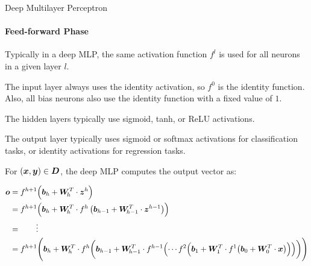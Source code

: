 %
\begin{frame}{Deep Multilayer Perceptron}
\framesubtitle{Feed-forward Phase} 
%
Typically in a deep MLP, the same activation function $f^l$ is used for
all neurons in a given layer $l$.  

	\medskip The input layer always uses the identity activation, so $f^0$ is the identity function. Also, all bias neurons also
use the identity function with a fixed value of $1$.  

\medskip

The hidden layers typically use sigmoid, tanh, or ReLU activations.  

	\medskip

	The output layer
typically uses sigmoid or softmax activations for classification tasks,
or identity activations for regression tasks. 


%
For %
$({\boldsymbol x}, {\boldsymbol y}) \in {\boldsymbol D}$,
the deep MLP computes the output vector as:
\begin{small}
\begin{samepage}
\begin{align*}
    \bo & = f^{h+1}\Bigl(\bb_{h} + \bW_{\!h}^T \cdot \bz^h\Bigr)\\ 
    & = f^{h+1}\Bigl(\bb_{h} + \bW_{\!h}^T \cdot 
    f^h\lB(\bb_{h-1} + \bW_{\!h-1}^T \cdot \bz^{h-1} \rB) \Bigr)\\
    & = \qquad \vdots\\
    & = f^{h+1}\Biggl(\bb_{h} + \bW_{\!h}^T \cdot 
        f^h\biggl(\bb_{h-1} + \bW_{\!h-1}^T \cdot f^{h-1}%
            \Bigl(\cdots f^2 \Bigl(\bb_{1} +  \bW_{1}^T \cdot
                f^1 \bigl(\bb_{0} +  \bW_{0}^T \cdot \bx
\bigr) \Bigr) \Bigr) \biggr) \Biggr) 
\end{align*}
\end{samepage}
\end{small}
\end{frame}
